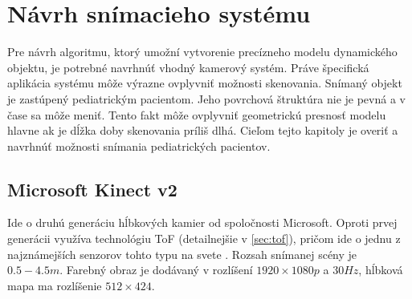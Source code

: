 
\chapter{Návrh snímacieho systému} 
\label{kap:návrh systému}
\pagestyle{fancy}
\fancyhf{}
\fancyfoot[CE,CO]{\thepage}
\renewcommand{\footrulewidth}{1pt}

Pre návrh algoritmu, ktorý umožní vytvorenie precízneho modelu dynamického objektu, je potrebné navrhnúť vhodný kamerový systém. Práve špecifická aplikácia systému môže výrazne ovplyvniť možnosti skenovania. Snímaný objekt je zastúpený pediatrickým pacientom. Jeho povrchová štruktúra nie je pevná a v čase sa môže meniť. Tento fakt môže ovplyvniť geometrickú presnosť modelu hlavne ak je dĺžka doby skenovania príliš dlhá. Cieľom tejto kapitoly je overiť a navrhnúť možnosti snímania pediatrických pacientov.


%
%
%

\section{Microsoft Kinect v2}

Ide o druhú generáciu hĺbkových kamier od spoločnosti Microsoft. Oproti prvej generácii využíva technológiu ToF (detailnejšie v \ref{sec:tof}), pričom ide o jednu z najznámejších senzorov tohto typu na svete \cite{wiki:kinect}. Rozsah snímanej scény je $0.5-4.5 m$. Farebný obraz je dodávaný v rozlíšení $1920\times1080p$ a $30Hz$, hĺbková mapa ma rozlíšenie $512\times424$.


